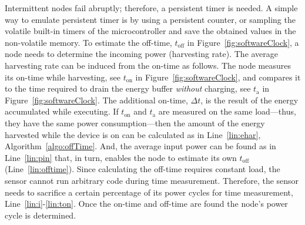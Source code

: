 Intermittent nodes fail abruptly; therefore, a persistent timer is needed. A simple way to emulate persistent timer is by using a persistent counter, or sampling the volatile built-in timers of the microcontroller and save the obtained values in the non-volatile memory. To estimate the off-time, $t_\text{off}$ in Figure~\ref{fig:softwareClock}, a node needs to determine the incoming power (harvesting rate). The average harvesting rate can be induced from the on-time as follows.
%
The node measures its on-time while harvesting, see $t_\text{on}$ in Figure~\ref{fig:softwareClock}, and compares it to the time required to drain the energy buffer \emph{without} charging, see $t_\text{a}$ in Figure~\ref{fig:softwareClock}. The additional on-time, $\Delta t$, is the result of the energy accumulated while executing. 
%
If $t_\text{on}$ and $t_\text{a}$ are measured on the same load---thus, they have the same power consumption---then the amount of the energy harvested while the device is on can be calculated as in Line~\ref{lin:ehar}, Algorithm~\ref{algo:offTime}. And, the average input power can be found as in Line~\ref{lin:pin} that, in turn, enables the node to estimate its own $t_\text{off}$ (Line~\ref{lin:offtime}).
Since calculating the off-time requires constant load, the sensor cannot run arbitrary code during time measurement. Therefore, the sensor needs to sacrifice a certain percentage of its power cycles for time measurement, Line~\ref{lin:i}-\ref{lin:ton}. Once the on-time and off-time are found the node's power cycle is determined.


